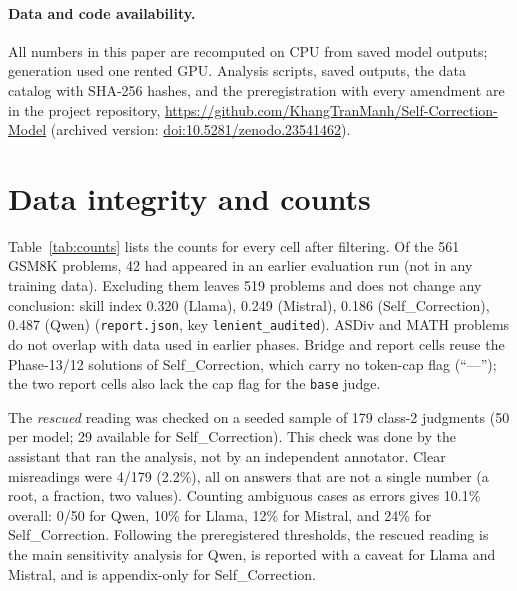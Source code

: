\documentclass[11pt]{article}
\begin{document}
\paragraph{Data and code availability.} All numbers in this paper are recomputed on CPU from saved model
outputs; generation used one rented GPU. Analysis scripts, saved outputs, the data catalog with SHA-256 hashes,
and the preregistration with every amendment are in the project repository,
\url{https://github.com/KhangTranManh/Self-Correction-Model}
(archived version: \href{https://doi.org/10.5281/zenodo.23541462}{doi:10.5281/zenodo.23541462}).




\appendix
\section{Data integrity and counts}
Table~\ref{tab:counts} lists the counts for every cell after filtering. Of the 561 GSM8K problems, 42 had
appeared in an earlier evaluation run (not in any training data). Excluding them leaves 519 problems and does
not change any conclusion: skill index 0.320 (Llama), 0.249 (Mistral), 0.186 (Self\_Correction), 0.487 (Qwen)
(\texttt{report.json}, key \texttt{lenient\_audited}). ASDiv and MATH problems do
not overlap with data used in earlier phases. Bridge and report cells reuse the Phase-13/12 solutions of
Self\_Correction, which carry no token-cap flag (``---''); the two report cells also lack the cap flag for the
\texttt{base} judge.

\begin{table}[h]
\centering\scriptsize
\caption{Counts per cell. Cap columns: share (\%) of solutions hitting the 768-token cap and of judgments
hitting the judge cap (\texttt{base}, \texttt{base\_c}).}
\label{tab:counts}
\resizebox{\linewidth}{!}{}
\end{table}

The \emph{rescued} reading was checked on a seeded sample of 179 class-2 judgments (50 per model; 29 available
for Self\_Correction). This check was done by the assistant that ran the analysis, not by an independent
annotator. Clear misreadings were 4/179 (2.2\%), all on answers that are not a single number (a root, a
fraction, two values). Counting ambiguous cases as errors gives 10.1\% overall: 0/50 for Qwen, 10\% for
Llama, 12\% for Mistral, and 24\% for Self\_Correction. Following the preregistered thresholds, the rescued
reading is the main sensitivity analysis for Qwen, is reported with a caveat for Llama and Mistral, and is
appendix-only for Self\_Correction.
\end{document}
